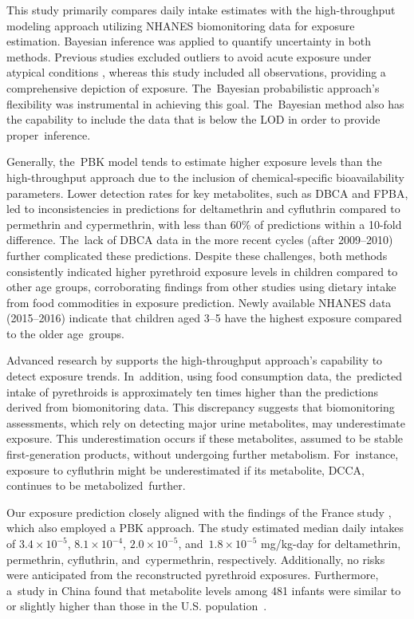 \documentclass[toxics,article,accept,pdftex,moreauthors]{Definitions/mdpi}
\begin{document}
This study primarily compares daily intake estimates with the
high-throughput modeling approach utilizing NHANES biomonitoring data
for exposure estimation. Bayesian inference was applied to quantify
uncertainty in both methods. Previous studies excluded outliers to
avoid acute exposure under atypical conditions
\citep{bao2020association}, whereas this study included all observations,
providing a comprehensive depiction of exposure. The~Bayesian
probabilistic approach's flexibility was instrumental in achieving this
goal. The~Bayesian method also has the capability to include the data
that is below the LOD in order to provide proper~inference.

Generally, the~PBK model tends to estimate higher exposure levels than the
high-throughput approach due to the inclusion of chemical-specific
bioavailability parameters. Lower detection rates for key metabolites,
such as DBCA and FPBA, led to inconsistencies in predictions for
deltamethrin and cyfluthrin compared to permethrin and cypermethrin,
with less than 60\% of predictions within a 10-fold difference. The~lack
of DBCA data in the more recent cycles (after 2009--2010) further complicated
these predictions. Despite these challenges, both methods consistently
indicated higher pyrethroid exposure levels in children compared to
other age groups, corroborating findings from other studies using
dietary intake from food commodities in exposure prediction. Newly
available NHANES data (2015--2016) indicate that children aged 3--5 have the highest
exposure compared to the older age~groups.

Advanced research by \citet{stanfield2024characterizing} supports the
high-throughput approach's capability to detect exposure trends. In~addition, using food consumption data, the~predicted intake of
pyrethroids is approximately ten times higher than the predictions
derived from biomonitoring data. This discrepancy suggests that
biomonitoring assessments, which rely on detecting major urine
metabolites, may underestimate exposure. This underestimation occurs if
these metabolites, assumed to be stable first-generation products,
without undergoing further metabolism. For~instance, exposure to
cyfluthrin might be underestimated if its metabolite, DCCA, continues to
be metabolized~further.

Our exposure prediction closely aligned with the findings of the France study
\citep{quindroit2021estimating}, which also employed a PBK approach. 
The study estimated median daily intakes of \(3.4 \times 10^{-5}\), \(8.1 \times
10^{-4}\), \(2.0 \times 10^{-5}\), and~\(1.8 \times 10^{-5}\) mg/kg-day for
deltamethrin, permethrin, cyfluthrin, and~cypermethrin, respectively.
Additionally, no risks were anticipated from the reconstructed pyrethroid
exposures. Furthermore, a~study in China found that metabolite levels among 481
infants were similar to or slightly higher than those in the U.S. population~\citep{wu2013urinary}.
\end{document}
